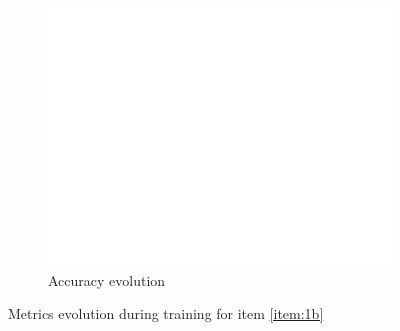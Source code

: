 \documentclass[10pt, a4paper]{article}
\begin{document}
\begin{figure}[htpb]
\begin{subfigure}[b]{0.32\textwidth}
      \centering
      \includegraphics[width=\textwidth]{images/Patch64_imagenet_acc.pdf}
      \caption{Accuracy evolution}
      \label{fig:q1b_acc}
  \end{subfigure}
  \caption{Metrics evolution during training for item \ref{item:1b}}
  \label{fig:q1b_metrics}
\end{figure}
\end{document}
